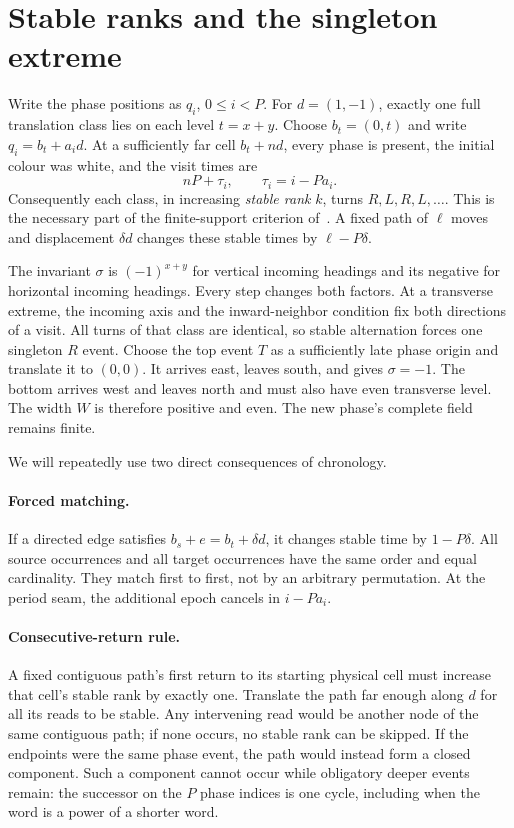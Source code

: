 \documentclass[11pt]{article}
\begin{document}
\section{Stable ranks and the singleton extreme}
Write the phase positions as $q_i$, $0\le i<P$. For $d=(1,-1)$, exactly one
full translation class lies on each level $t=x+y$. Choose $b_t=(0,t)$ and write
$q_i=b_t+a_i d$. At a sufficiently far cell $b_t+nd$, every phase is present,
the initial colour was white, and the visit times are
\[
 nP+\tau_i,\qquad \tau_i=i-Pa_i.
\]
Consequently each class, in increasing \emph{stable rank} $k$, turns
$R,L,R,L,\ldots$. This is the necessary part of the finite-support criterion
of~\cite{J}. A fixed path of $\ell$ moves and displacement $\delta d$ changes
these stable times by $\ell-P\delta$.

The invariant $\sigma$ is $(-1)^{x+y}$ for vertical incoming headings and its
negative for horizontal incoming headings. Every step changes both factors.
At a transverse extreme, the incoming axis and the inward-neighbor condition
fix both directions of a visit. All turns of that class are identical, so
stable alternation forces one singleton $R$ event. Choose the top event $T$
as a sufficiently late phase origin and translate it to $(0,0)$. It arrives
east, leaves south, and gives $\sigma=-1$. The bottom arrives west and leaves
north and must also have even transverse level. The width $W$ is therefore
positive and even. The new phase's complete field remains finite.

We will repeatedly use two direct consequences of chronology.

\paragraph{Forced matching.}
If a directed edge satisfies $b_s+e=b_t+\delta d$, it changes stable time by
$1-P\delta$. All source occurrences and all target occurrences have the same
order and equal cardinality. They match first to first, not by an arbitrary
permutation. At the period seam, the additional epoch cancels in $i-Pa_i$.

\paragraph{Consecutive-return rule.}
A fixed contiguous path's first return to its starting physical cell must
increase that cell's stable rank by exactly one. Translate the path far enough
along $d$ for all its reads to be stable. Any intervening read would be another
node of the same contiguous path; if none occurs, no stable rank can be skipped.
If the endpoints were the same phase event, the path would instead form a
closed component. Such a component cannot occur while obligatory deeper events
remain: the successor on the $P$ phase indices is one cycle, including when
the word is a power of a shorter word.
\end{document}
